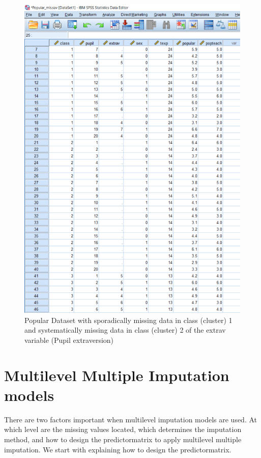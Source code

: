 \documentclass[
]{book}
\begin{document}
\begin{figure}

{\centering \includegraphics[width=0.9\linewidth]{images/fig7.20} 

}

\caption{Popular Dataset with sporadically missing data in class (cluster) 1 and systematically missing data in class (cluster) 2 of the extrav variable (Pupil extraversion)}\label{fig:fig85}
\end{figure}

\hypertarget{multilevel-multiple-imputation-models}{%
\section{Multilevel Multiple Imputation models}\label{multilevel-multiple-imputation-models}}

There are two factors important when multilevel imputation models are used. At which level are the missing values located, which determines the imputation method, and how to design the predictormatrix to apply multilevel multiple imputation. We start with explaining how to design the predictormatrix.
\end{document}
